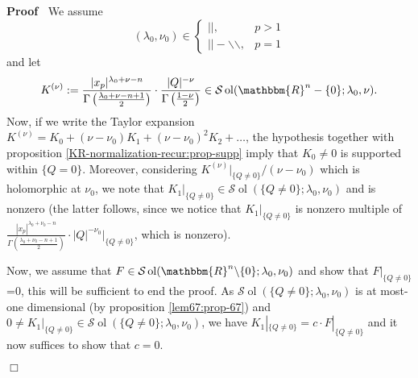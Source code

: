\documentclass{article}
\newcommand{\assign}{:=}
\newcommand{\tmop}[1]{\ensuremath{\operatorname{#1}}}
\newcommand{\um}{-}
\newenvironment{proof}{\noindent\textbf{Proof\ }}{\hspace*{\fill}$\Box$\medskip}
\numberwithin{definition}{section}
\numberwithin{lemma}{section}
\numberwithin{proposition}{section}
{\theorembodyfont{\rmfamily}\newtheorem{remark}{Remark}
\numberwithin{remark}{section}
}
\begin{document}
\begin{proof}
  We assume
  \[ ( \lambda_0, \nu_0) \in \left\{ \begin{array}{ll}
       | |, & p > 1\\
       | | \um \backslash\backslash, & p = 1
     \end{array} \right. \]
  and let
  \[ K_{}^{( \nu)} \assign \frac{| x_p |^{\lambda_0 + \nu - n}}{\Gamma \left(
     \frac{\lambda_0 + \nu - n + 1}{2} \right)} \cdot \frac{| Q |^{-
     \nu}}{\Gamma \left( \frac{1 - \nu}{2} \right)} \in \mathcal{S} \tmop{ol}
     ( \mathbbm{R}^n - \{ 0 \} ; \lambda_0, \nu) . \]
  Now, if we write the Taylor expansion $K_{}^{( \nu)} = K_0 + ( \nu - \nu_0)
  K_1 + ( \nu - \nu_0)^2 K_2 + \ldots$, the hypothesis together with
  proposition \ref{KR-normalization-recur:prop-supp} imply that $K_0 \neq 0$
  is supported within $\{ Q = 0 \}$. Moreover, considering $K^{( \nu)} |_{\{ Q
  \neq 0 \}} / ( \nu - \nu_0)$ which is holomorphic at $\nu_0$, we note that
  $K_1 |_{\{ Q \neq 0 \}} \in \mathcal{S} \tmop{ol} ( \{ Q \neq 0 \} ;
  \lambda_0, \nu_0)$ and is nonzero (the latter follows, since we notice that
  $K_1 |_{\{ Q \neq 0 \}}$ is nonzero multiple of $\frac{| x_p |^{\lambda_0 +
  \nu_0 - n}}{\Gamma \left( \frac{\lambda_0 + \nu_0 - n + 1}{2} \right)} \cdot
  | Q |^{- \nu_0} |_{\{ Q \neq 0 \}}$, which is nonzero).
  
  Now, we assume that $F \in \mathcal{S} \tmop{ol} ( \mathbbm{R}^n \backslash
  \{ 0 \} ; \lambda_0, \nu_0)$ and show that $F |_{\{ Q \neq 0 \}}$=0, this
  will be sufficient to end the proof. As $\mathcal{S} \tmop{ol} ( \{ Q \neq 0
  \} ; \lambda_0, \nu_0)$ is at most-one dimensional (by proposition
  \ref{lem67:prop-67}) and $0 \neq K_1 |_{\{ Q \neq 0 \}} \in \mathcal{S}
  \tmop{ol} ( \{ Q \neq 0 \} ; \lambda_0, \nu_0)$, we have $K_1 |_{\{ Q \neq 0
  \}} = c \cdot F |_{\{ Q \neq 0 \}}$ and it now suffices to show that $c =
  0$.
  

\end{proof}
\end{document}
